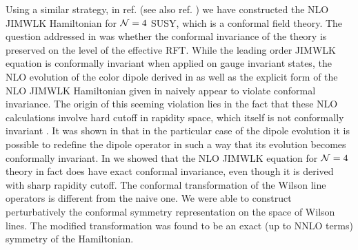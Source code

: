 \documentclass[11pt,a4paper]{article}
\begin{document}
Using a similar strategy, in ref. \cite{KLMconf} (see also ref. \cite{Simon}) we have constructed the NLO JIMWLK Hamiltonian  for ${\cal N}=4$ SUSY, which is a conformal field theory. The question
addressed in \cite{KLMconf} was   whether  the conformal invariance of the theory is preserved on the level of the effective RFT. While
the leading order JIMWLK equation is conformally invariant when applied on gauge invariant states,  
the NLO evolution of the color dipole derived in \cite{BC} as well as the explicit form of the NLO JIMWLK Hamiltonian given in \cite{nlojimwlk} 
naively appear to violate conformal invariance.  The origin of this seeming violation lies in the fact that 
 these  NLO calculations involve hard cutoff in rapidity space, which itself is not conformally invariant \cite{FF}. 
It was shown in \cite{N=4} that in the particular case of the dipole evolution it is possible to redefine the dipole operator in such a way that its evolution becomes conformally invariant.  In \cite{KLMconf} we showed that the NLO JIMWLK equation for ${\cal N}=4$ theory in fact does have  exact conformal invariance, even though it is derived with sharp rapidity cutoff. The conformal transformation of the Wilson line operators is  different from the naive one.  We were able to 
construct perturbatively the conformal symmetry representation on the space of Wilson lines.  The modified transformation was found to be an 
exact (up to NNLO terms) symmetry of the Hamiltonian. 






 
\end{document}
